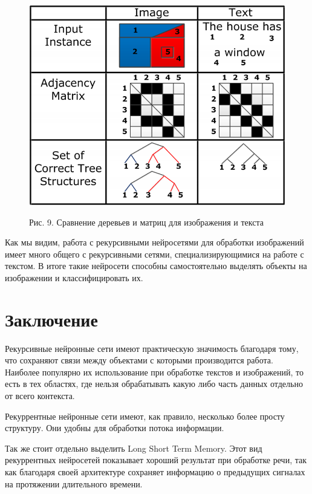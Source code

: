 \documentclass[14pt]{article}
\begin{document}
\begin{figure}[!h]
    \centering
        \includegraphics[width=14cm]{Fig9.png}
    \parbox[t][1.2cm][c]{16cm}{
        \centering
        Рис. 9. Сравнение деревьев и матриц для изображения и текста
    }
\end{figure}


Как мы видим, работа с рекурсивными нейросетями для обработки изображений имеет много общего с рекурсивными сетями, специализирующимися на работе с текстом. В итоге такие нейросети способны самостоятельно выделять объекты на изображении и классифицировать их.


\pagebreak

\section{Заключение}
Рекурсивные нейронные сети имеют практическую значимость благодаря тому, что сохраняют связи между объектами с которыми производится работа. Наиболее популярно их использование при обработке текстов и изображений, то есть в тех областях, где нельзя обрабатывать какую либо часть данных отдельно от всего контекста.


Рекуррентные нейронные сети имеют, как правило, несколько более просту структуру. Они удобны для обработки потока информации.


Так же стоит отдельно выделить Long Short Term Memory. Этот вид рекуррентных нейросетей показывает хороший результат при обработке речи, так как благодаря своей архитектуре сохраняет информацию о предыдущих сигналах на протяжении длительного времени.
\end{document}
